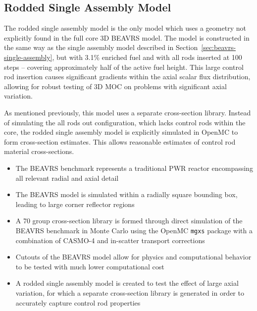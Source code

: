 \subsection{Rodded Single Assembly Model}
\label{sec:rodded-single-assembly}

The rodded single assembly model is the only model which uses a geometry not explicitly found in the full core 3D BEAVRS model. The model is constructed in the same way as the single assembly model described in Section~\ref{sec:beavrs-single-assembly}, but with 3.1\% enriched fuel and with all rods inserted at 100 steps -- covering approximately half of the active fuel height. This large control rod insertion causes significant gradients within the axial scalar flux distribution, allowing for robust testing of 3D \ac{MOC} on problems with significant axial variation.

As mentioned previously, this model uses a separate cross-section library. Instead of simulating the all rods out configuration, which lacks control rods within the core, the rodded single assembly model is explicitly simulated in OpenMC to form cross-section estimates. This allows reasonable estimates of control rod material cross-sections.


\newpage
\vfill
\begin{highlightsbox}[frametitle=Highlights]
	\begin{itemize}
		\item The BEAVRS benchmark represents a traditional \ac{PWR} reactor encompassing all relevant radial and axial detail
		\item The BEAVRS model is simulated within a radially square bounding box, leading to large corner reflector regions
		\item A 70 group cross-section library is formed through direct simulation of the BEAVRS benchmark in Monte Carlo using the OpenMC \texttt{mgxs} package with a combination of CASMO-4 and in-scatter transport corrections
		\item Cutouts of the BEAVRS model allow for physics and computational behavior to be tested with much lower computational cost
		\item A rodded single assembly model is created to test the effect of large axial variation, for which a separate cross-section library is generated in order to accurately capture control rod properties
		
	\end{itemize}
\end{highlightsbox}
\vfill

